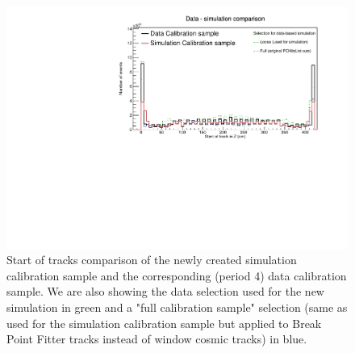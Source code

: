 \documentclass[12pt]{article}
\begin{document}
\begin{figure}[!ht]
\includegraphics[clip, width=\textwidth]{DataMCComparison_StartZ.pdf}
\caption{Start of tracks comparison of the newly created simulation calibration sample and the corresponding (period 4) data calibration sample. We are also showing the data selection used for the new simulation in green and a "full calibration sample" selection (same as used for the simulation calibration sample but applied to Break Point Fitter tracks instead of window cosmic tracks) in blue.}
\label{figDataMCComparison_startZ}
\end{figure}
\end{document}
